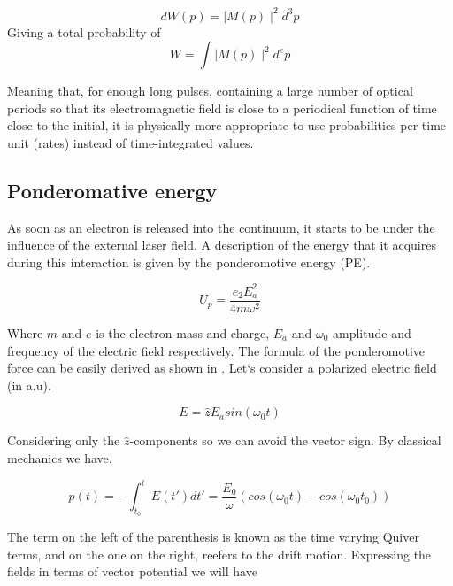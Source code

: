 \begin{equation}
dW(p)=\mid M(p)\mid^{2} d^{3}p
\end{equation}
 Giving a total probability of
 \begin{equation}
 W= \int \mid M(p)\mid^{2} d^{e}p
 \end{equation}
 
Meaning that, for enough long pulses, containing a large number of optical periods so that its electromagnetic field is close to a periodical function of time close to the initial, it is physically more appropriate to use probabilities per time unit (rates) instead of time-integrated values.

\subsection{Ponderomative energy}


As soon as an electron is released into the continuum, it starts to be under the influence of the external laser field. A description of the energy that it acquires during this interaction is given by the ponderomotive energy (PE).

\begin{equation}
U_{p} = \dfrac{e_{2}E_{a}^{2}}{4m \omega^{2}}
\end{equation}

Where $m$ and $e$ is the electron mass and charge, $E_{a}$ and $\omega_{0}$  amplitude and frequency of the electric field respectively. The formula of the ponderomotive force can be easily derived as shown in \cite{protopapas_atomic_1997}\cite{connerade_highly_1998}. Let`s consider a polarized electric field (in a.u).

\begin{equation}
E=\widehat{z}E_{a}sin(\omega_{0} t) 
\end{equation}

Considering only the $\widehat{z}$-components so we can avoid the vector sign. By classical mechanics we have.

\begin{equation}
p(t)=-\int_{t_{0}}^{t} E(t\prime)dt\prime = \dfrac{E_{0}}{\omega} (cos(\omega_{0} t)- cos(\omega_{0} t_{0}))
\end{equation}

The term on the left of the parenthesis is known as the time varying Quiver terms, and on the one on the right, reefers to the drift motion. 
Expressing the fields in terms of vector potential we will have

